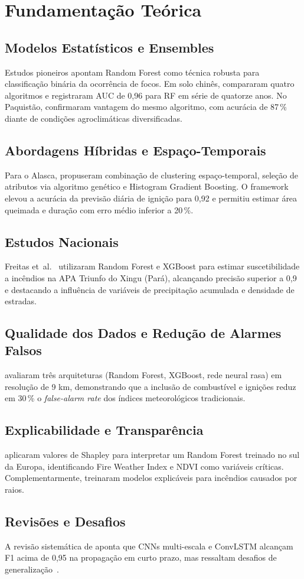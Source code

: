 
\chapter{Fundamentação Teórica}

\section{Modelos Estatísticos e Ensembles}
Estudos pioneiros apontam Random Forest como técnica robusta para classificação binária da ocorrência de focos. Em solo chinês, \cite{pang2022china} compararam quatro algoritmos e registraram AUC de 0,96 para RF em série de quatorze anos. No Paquistão, \cite{shahzad2024pakistan} confirmaram vantagem do mesmo algoritmo, com acurácia de 87\,\% diante de condições agroclimáticas diversificadas.

\section{Abordagens Híbridas e Espaço-Temporais}
Para o Alasca, \cite{ahajjam2025wildfire} propuseram combinação de clustering espaço-temporal, seleção de atributos via algoritmo genético e Histogram Gradient Boosting. O framework elevou a acurácia da previsão diária de ignição para 0,92 e permitiu estimar área queimada e duração com erro médio inferior a 20\,\%.

\section{Estudos Nacionais}
Freitas et~al.~\cite{freitas2025xingu} utilizaram Random Forest e XGBoost para estimar suscetibilidade a incêndios na APA Triunfo do Xingu (Pará), alcançando precisão superior a 0,9 e destacando a influência de variáveis de precipitação acumulada e densidade de estradas.

\section{Qualidade dos Dados e Redução de Alarmes Falsos}
\cite{giuseppe2025global} avaliaram três arquiteturas (Random Forest, XGBoost, rede neural rasa) em resolução de 9 km, demonstrando que a inclusão de combustível e ignições reduz em 30\,\% o \textit{false-alarm rate} dos índices meteorológicos tradicionais.

\section{Explicabilidade e Transparência}
\cite{cilli2022xai} aplicaram valores de Shapley para interpretar um Random Forest treinado no sul da Europa, identificando Fire Weather Index e NDVI como variáveis críticas. Complementarmente, \cite{shmuel2025lightning} treinaram modelos explicáveis para incêndios causados por raios.

\section{Revisões e Desafios}
A revisão sistemática de \cite{andrianarivony2024review} aponta que CNNs multi-escala e ConvLSTM alcançam F1 acima de 0,95 na propagação em curto prazo, mas ressaltam desafios de generalização~\cite{illarionova2025geo}.
